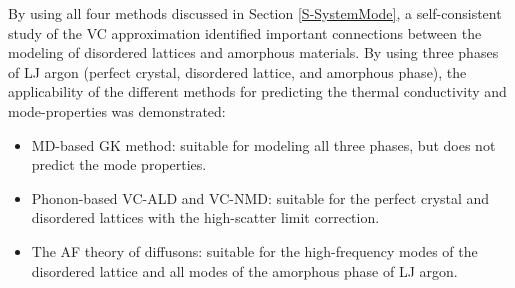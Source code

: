 By using all four methods discussed in Section \ref{S-SystemMode}, 
a self-consistent study of the VC approximation 
identified important connections between the modeling 
of disordered lattices and amorphous materials. 
By using three phases of LJ argon (perfect crystal, disordered lattice, 
and amorphous phase), the applicability 
of the different methods for predicting the thermal conductivity and 
mode-properties was demonstrated:
\begin{itemize}
\item MD-based GK method: suitable for modeling all 
three phases, but does not predict the mode properties.
\item Phonon-based VC-ALD and VC-NMD: suitable for the perfect crystal 
and disordered lattices with the high-scatter limit correction.
\item The AF theory of diffusons: suitable for the high-frequency modes 
of the disordered lattice and all modes of the amorphous phase of 
LJ argon. 
\end{itemize}


% 

